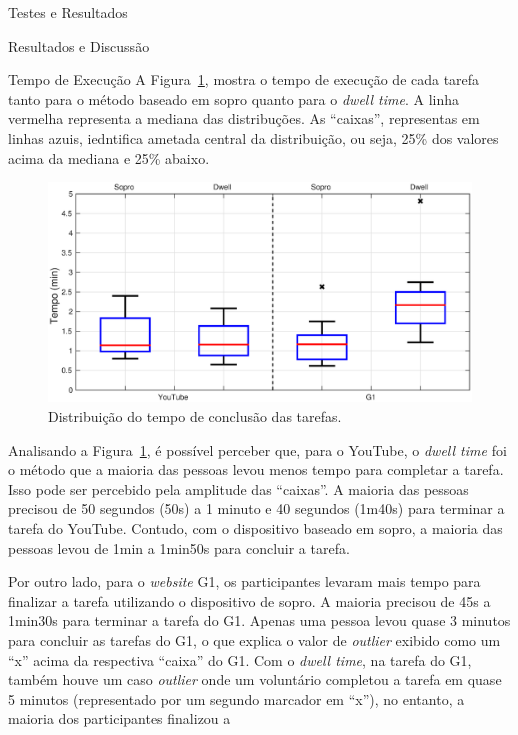 \begin{chapter}{Testes e Resultados}
\begin{section}{Resultados e Discussão}
\begin{subsection}{Tempo de Execução}
A Figura~\ref{fig:tempo}, mostra o tempo de execução de cada tarefa tanto para o
método baseado em sopro quanto para o \textit{dwell time}. A linha vermelha
representa a mediana das distribuções. As ``caixas'', representas em linhas
azuis, iedntifica  ametada central da distribuição, ou seja, 25\% dos valores
acima da mediana e 25\% abaixo.

\begin{figure}[!h]
	\centering
	\includegraphics[width=1.0\linewidth]{fig/time}
	\caption{Distribuição do tempo de conclusão das tarefas.}
	\label{fig:tempo}
\end{figure}

Analisando a Figura~\ref{fig:tempo}, é possível perceber que, para o YouTube, o
\textit{dwell time} foi o método que a maioria das pessoas levou menos tempo
para completar a tarefa. Isso pode ser percebido pela amplitude das ``caixas''.
A maioria das pessoas precisou de 50 segundos (50s) a 1 minuto e 40 segundos
(1m40s) para terminar a tarefa do YouTube. Contudo, com o dispositivo baseado em
sopro, a maioria das pessoas levou de 1min a 1min50s para concluir a tarefa.

Por outro lado, para o \textit{website} G1, os participantes levaram mais tempo
para finalizar a tarefa utilizando o dispositivo de sopro. A maioria precisou de
45s a 1min30s para terminar a tarefa do G1. Apenas uma pessoa levou quase 3
minutos para concluir as tarefas do G1, o que explica o valor de
\textit{outlier} exibido como um ``x'' acima da respectiva ``caixa'' do G1. Com
o \textit{dwell time}, na tarefa do G1, também houve um caso \textit{outlier}
onde um voluntário completou a tarefa em quase 5 minutos (representado por um
segundo marcador em ``x''), no entanto, a maioria dos participantes finalizou a


\end{subsection}
\end{section}
\end{chapter}

